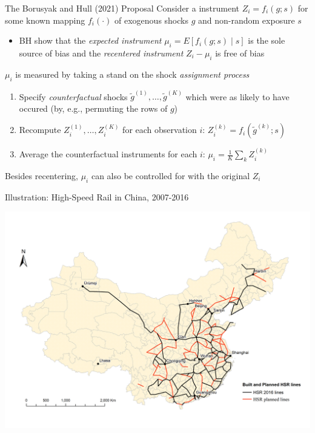 \documentclass{beamer}
\begin{document}
\begin{frame}{The Borusyak and Hull (2021) Proposal}
Consider a instrument $Z_i=f_i(g;s)$ for some known mapping $f_i(\cdot)$ of exogenous shocks $g$ and non-random exposure $s$\smallskip
\begin{itemize}
\item BH show that the \emph{expected instrument} $\mu_i=E[f_i(g;s)\mid s]$ is the sole source of bias and the \emph{recentered instrument} $Z_i-\mu_i$ is free of bias
\end{itemize}\medskip\pause{}

$\mu_i$ is measured by taking a stand on the shock \emph{assignment process}\smallskip\pause{}
\begin{enumerate}
\item Specify \emph{counterfactual} shocks $\tilde{g}^{(1)},\dots,\tilde{g}^{(K)}$ which were as likely to have occured (by, e.g., permuting the rows of $g$)\smallskip\pause{}
\item Recompute $Z_i^{(1)},\dots,Z_i^{(K)}$ for each observation $i$: $Z_i^{(k)}=f_i(\tilde{g}^{(k)};s)$\smallskip\pause{}
\item Average the counterfactual instruments for each $i$: $\mu_i=\frac{1}{K}\sum_k Z_i^{(k)}$
\end{enumerate}\medskip\pause{}

Besides recentering, $\mu_i$ can also be controlled for with the original $Z_i$

\end{frame}

\begin{frame}{Illustration: High-Speed Rail in China, 2007-2016}
\vspace{-1cm}
\begin{center}
\includegraphics[scale=0.4]{./lecture_includes/Lines_actual_planned.png}
\end{center}

\end{frame}
\end{document}
